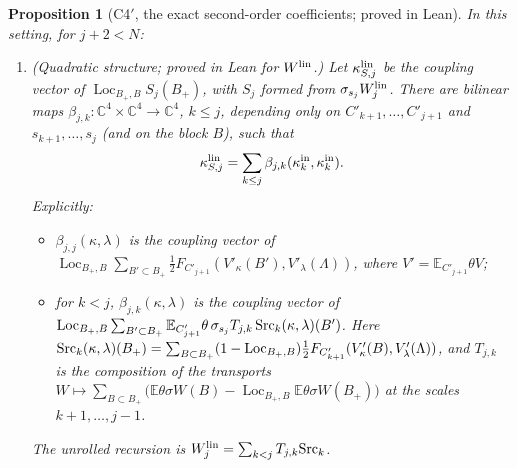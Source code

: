 \documentclass[11pt]{amsart}
\newtheorem{proposition}[theorem]{Proposition}
\theoremstyle{definition}
\theoremstyle{remark}
\numberwithin{equation}{section}
\newcommand{\C}{\mathbb{C}}
\newcommand{\E}{\mathbb{E}}
\newcommand{\Loc}{\operatorname{Loc}}
\begin{document}
\begin{proposition}[C4$'$, the exact second-order coefficients; proved in Lean]\label{prop:C4b}
In this setting, for $j+2<N$:
\begin{enumerate}
\item[(a)] (Quadratic structure; proved in Lean for $W^{\rm lin}$.) Let $\kappa^{\rm lin}_{S,j}$
  be the coupling vector of $\Loc_{B_+,B}S_j(B_+)$, with $S_j$ formed from $\sigma_{s_j}W^{\rm lin}_j$.
  There are bilinear maps $\beta_{j,k}:\C^4\times\C^4\to\C^4$, $k\le j$, depending only on
  $C'_{k+1},\dots,C'_{j+1}$ and $s_{k+1},\dots,s_j$ (and on the block $B$), such that
  \[
    \kappa^{\rm lin}_{S,j}=\sum_{k\le j}\beta_{j,k}(\kappa^{\rm in}_k,\kappa^{\rm in}_k).
  \]
  Explicitly:
  \begin{itemize}
  \item $\beta_{j,j}(\kappa,\lambda)$ is the coupling vector of
    $\Loc_{B_+,B}\sum_{B'\subset B_+}\frac12F_{C'_{j+1}}(V'_\kappa(B'),V'_\lambda(\Lambda))$, where
    $V'=\E_{C'_{j+1}}\theta V$;
  \item for $k<j$, $\beta_{j,k}(\kappa,\lambda)$ is the coupling vector of
    $\Loc_{B_+,B}\sum_{B'\subset B_+}\E_{C'_{j+1}}\theta\,\sigma_{s_j}T_{j,k}\,{\rm Src}_k(\kappa,\lambda)(B')$.
    Here ${\rm Src}_k(\kappa,\lambda)(B_+)=\sum_{B\subset B_+}(1-\Loc_{B_+,B})\frac12F_{C'_{k+1}}(V'_\kappa(B),
    V'_\lambda(\Lambda))$, and $T_{j,k}$ is the composition of the transports
    $W\mapsto\sum_{B\subset B_+}\bigl(\E\theta\sigma W(B)-\Loc_{B_+,B}\E\theta\sigma W(B_+)\bigr)$
    at the scales $k+1,\dots,j-1$.
  \end{itemize}
  The unrolled recursion is $W^{\rm lin}_j=\sum_{k<j}T_{j,k}{\rm Src}_k$.


\end{enumerate}
\end{proposition}
\end{document}
